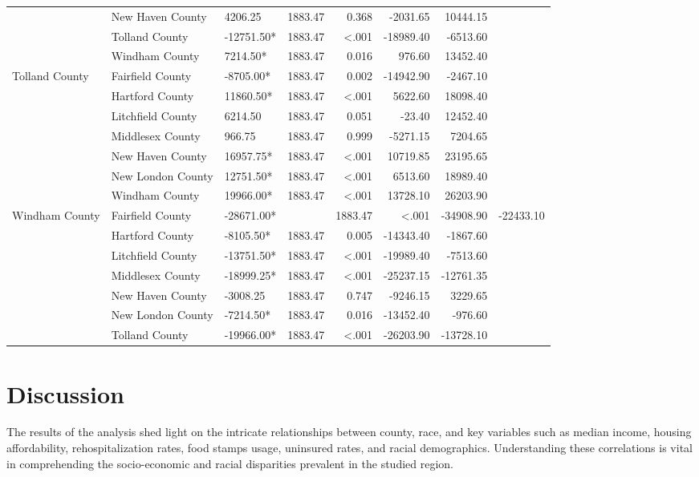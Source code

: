 \documentclass[12pt]{article}
\begin{document}
\begin{table}[htbp]
{\begin{tabular}{lllrrrr}
  & New Haven County & 4206.25 & 1883.47 & 0.368 & -2031.65 & 10444.15 \\
  & Tolland County & -12751.50* & 1883.47 & <.001 & -18989.40 & -6513.60 \\
  & Windham County & 7214.50* & 1883.47 & 0.016 & 976.60 & 13452.40 \\
  \midrule
  Tolland County & Fairfield County & -8705.00* & 1883.47 & 0.002 & -14942.90 & -2467.10 \\
  & Hartford County & 11860.50* & 1883.47 & <.001 & 5622.60 & 18098.40 \\
  & Litchfield County & 6214.50 & 1883.47 & 0.051 & -23.40 & 12452.40 \\
  & Middlesex County & 966.75 & 1883.47 & 0.999 & -5271.15 & 7204.65 \\
  & New Haven County & 16957.75* & 1883.47 & <.001 & 10719.85 & 23195.65 \\
  & New London County & 12751.50* & 1883.47 & <.001 & 6513.60 & 18989.40 \\
  & Windham County & 19966.00* & 1883.47 & <.001 & 13728.10 & 26203.90 \\
  \midrule
  Windham County & Fairfield County & -28671.00* &  & 1883.47 & <.001 & -34908.90 & -22433.10 \\
  & Hartford County & -8105.50* & 1883.47 & 0.005 & -14343.40 & -1867.60 \\
  & Litchfield County & -13751.50* & 1883.47 & <.001 & -19989.40 & -7513.60 \\
  & Middlesex County & -18999.25* & 1883.47 & <.001 & -25237.15 & -12761.35 \\
  & New Haven County & -3008.25 & 1883.47 & 0.747 & -9246.15 & 3229.65 \\
  & New London County & -7214.50* & 1883.47 & 0.016 & -13452.40 & -976.60 \\
  & Tolland County & -19966.00* & 1883.47 & <.001 & -26203.90 & -13728.10 \\
  \end{tabular}%
  }
\end{table}
    

\section{Discussion}\label{sec:disc}

The results of the analysis shed light on the intricate relationships between county, race, and key 
variables such as median income, housing affordability, rehospitalization rates, food stamps usage, 
uninsured rates, and racial demographics. Understanding these correlations is vital in comprehending 
the socio-economic and racial disparities prevalent in the studied region.
\end{document}
